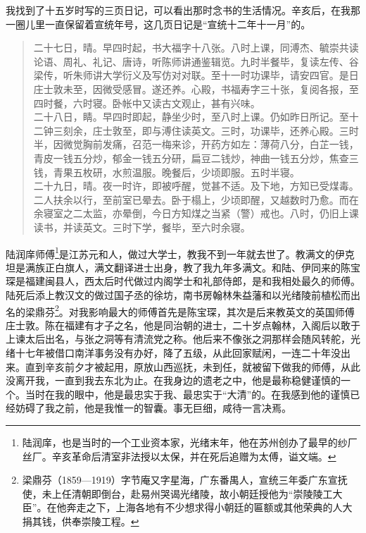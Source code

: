 我找到了十五岁时写的三页日记，可以看出那时念书的生活情况。辛亥后，在我那一圈儿里一直保留着宣统年号，这几页日记是“宣统十二年十一月”的。\\

\begin{quote}
	二十七日，晴。早四时起，书大福字十八张。八时上课，同溥杰、毓崇共读论语、周礼、礼记、唐诗，听陈师讲通鉴辑览。九时半餐毕，复读左传、谷梁传，听朱师讲大学衍义及写仿对对联。至十一时功课毕，请安四官。是日庄士敦未至，因微受感冒。遂还养。心殿，书福寿字三十张，复阅各报，至四时餐，六时寝。卧帐中又读古文观止，甚有兴味。\\

二十八日，睛。早四时即起，静坐少时，至八时上课。仍如昨日所记。至十二钟三刻余，庄士敦至，即与溥住读英文。三时，功课毕，还养心殿。三时半，因微觉胸前发痛，召范一梅来诊，开药方如左：薄荷八分，白芷一钱，青皮一钱五分炒，郁金一钱五分研，扁豆二钱炒，神曲一钱五分炒，焦查三钱，青果五枚研，水煎温服。晚餐后，少顷即服。五时半寝。\\

二十九日，晴。夜一时许，即被呼醒，觉甚不适。及下地，方知已受煤毒。二人扶余以行，至前室已晕去。卧于榻上，少顷即醒，又越数时乃愈。而在余寝室之二太监，亦晕倒，今日方知煤之当紧（警）戒也。八时，仍旧上课读书，并读英文。三时下学，餐毕，至六时余寝。\\
\end{quote}

陆润庠师傅\footnote{陆润庠，也是当时的一个工业资本家，光绪末年，他在苏州创办了最早的纱厂丝厂。辛亥革命后清室非法授以太保，并在死后追赠为太傅，谥文端。}是江苏元和人，做过大学士，教我不到一年就去世了。教满文的伊克坦是满族正白旗人，满文翻译进士出身，教了我九年多满文。和陆、伊同来的陈宝琛是福建闽县人，西太后时代做过内阁学士和礼部侍郎，是和我相处最久的师傅。陆死后添上教汉文的做过国子丞的徐坊，南书房翰林朱益藩和以光绪陵前植松而出名的梁鼎芬\footnote{梁鼎芬（1859—1919）字节庵又字星海，广东番禺人，宣统三年委广东宣抚使，未上任清朝即倒台，赴易州哭谒光绪陵，故小朝廷授他为“崇陵陵工大臣”。在他奔走之下，上海各地有不少想求得小朝廷的匾额或其他荣典的人大捐其钱，供奉崇陵工程。}。对我影响最大的师傅首先是陈宝琛，其次是后来教英文的英国师傅庄士敦。陈在福建有才子之名，他是同治朝的进士，二十岁点翰林，入阁后以敢于上谏太后出名，与张之洞等有清流党之称。他后来不像张之洞那样会随风转舵，光绪十七年被借口南洋事务没有办好，降了五级，从此回家赋闲，一连二十年没出来。直到辛亥前夕才被起用，原放山西巡抚，未到任，就被留下做我的师傅，从此没离开我，一直到我去东北为止。在我身边的遗老之中，他是最称稳健谨慎的一个。当时在我的眼中，他是最忠实于我、最忠实于“大清”的。在我感到他的谨慎已经妨碍了我之前，他是我惟一的智囊。事无巨细，咸待一言决焉。\\


